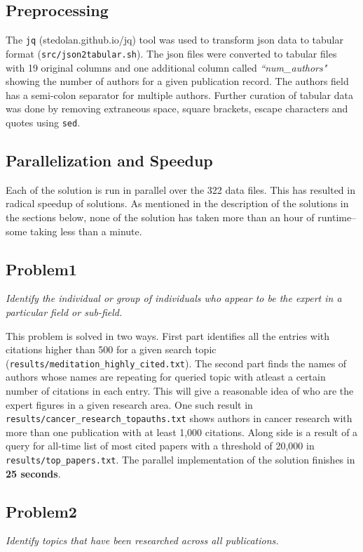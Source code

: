 \documentclass{article}
\begin{document}
\subsection*{Preprocessing}
The \texttt{jq} (stedolan.github.io/jq) tool was used to transform json data to
tabular format (\texttt{src/json2tabular.sh}).  The json files were converted
to tabular files with 19 original columns and one additional column called
\textit{``num\_authors"} showing the number of authors for a given publication
record. The authors field has a semi-colon separator for multiple authors.
Further curation of tabular data was done by removing extraneous space, square
brackets, escape characters and quotes using \texttt{sed}.

\subsection*{Parallelization and Speedup}
Each of the solution is run in parallel over the 322 data files. This has
resulted in radical speedup of solutions. As mentioned in the
description of the solutions in the sections below, none of the solution has
taken more than an hour of runtime--some taking less than a minute.

\subsection*{Problem1}
\textit{Identify the individual or group of individuals who appear to be the expert in a particular field or sub-field.}

This problem is solved in two ways. First part identifies all the entries with
citations higher than 500 for a given search topic
(\texttt{results/meditation\_highly\_cited.txt}). The second part finds the
names of authors whose names are repeating for queried topic with atleast a
certain number of citations in each entry. This will give a reasonable idea of
who are the expert figures in a given research area. One such result in
\texttt{results/cancer\_research\_topauths.txt} shows authors in cancer
research with more than one publication with at least 1,000 citations.  Along
side is a result of a query for all-time list of most cited papers with a
threshold of 20,000 in \texttt{results/top\_papers.txt}. The parallel
implementation of the solution finishes in \textbf{25 seconds}.

\subsection*{Problem2}
\textit{Identify topics that have been researched across all publications.}
\end{document}
